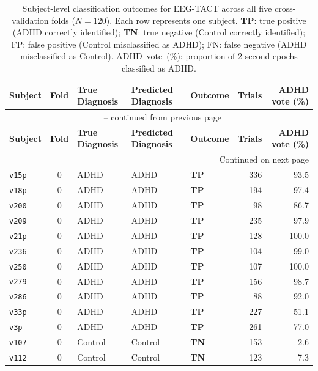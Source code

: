 \begin{longtable}{lclllrr}
  \caption{Subject-level classification outcomes for EEG-TACT across all five cross-validation folds ($N = 120$). Each row represents one subject. \textbf{TP}: true positive (ADHD correctly identified); \textbf{TN}: true negative (Control correctly identified); FP: false positive (Control misclassified as ADHD); FN: false negative (ADHD misclassified as Control). ADHD~vote~(\%): proportion of 2-second epochs classified as ADHD.} \label{tab:subject_casewise} \\
  \toprule
  \textbf{Subject} & \textbf{Fold} & \textbf{True Diagnosis} & \textbf{Predicted Diagnosis} & \textbf{Outcome} & \textbf{Trials} & \textbf{ADHD vote (\%)} \\
  \midrule
  \endfirsthead
  \multicolumn{7}{c}{{\tablename\ \thetable{} -- continued from previous page}} \\
  \toprule
  \textbf{Subject} & \textbf{Fold} & \textbf{True Diagnosis} & \textbf{Predicted Diagnosis} & \textbf{Outcome} & \textbf{Trials} & \textbf{ADHD vote (\%)} \\
  \midrule
  \endhead
  \midrule
  \multicolumn{7}{r}{{Continued on next page}} \\
  \endfoot
  \bottomrule
  \endlastfoot
  \texttt{v15p} & 0 & ADHD & ADHD & \textbf{TP} & 336 & 93.5 \\
  \texttt{v18p} & 0 & ADHD & ADHD & \textbf{TP} & 194 & 97.4 \\
  \texttt{v200} & 0 & ADHD & ADHD & \textbf{TP} & 98 & 86.7 \\
  \texttt{v209} & 0 & ADHD & ADHD & \textbf{TP} & 235 & 97.9 \\
  \texttt{v21p} & 0 & ADHD & ADHD & \textbf{TP} & 128 & 100.0 \\
  \texttt{v236} & 0 & ADHD & ADHD & \textbf{TP} & 104 & 99.0 \\
  \texttt{v250} & 0 & ADHD & ADHD & \textbf{TP} & 107 & 100.0 \\
  \texttt{v279} & 0 & ADHD & ADHD & \textbf{TP} & 156 & 98.7 \\
  \texttt{v286} & 0 & ADHD & ADHD & \textbf{TP} & 88 & 92.0 \\
  \texttt{v33p} & 0 & ADHD & ADHD & \textbf{TP} & 227 & 51.1 \\
  \texttt{v3p} & 0 & ADHD & ADHD & \textbf{TP} & 261 & 77.0 \\
  \texttt{v107} & 0 & Control & Control & \textbf{TN} & 153 & 2.6 \\
  \texttt{v112} & 0 & Control & Control & \textbf{TN} & 123 & 7.3 \\

\end{longtable}
